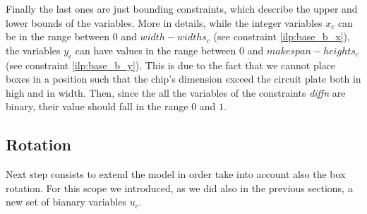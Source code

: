     Finally the last ones are just bounding constraints, which describe the upper and lower bounds
    of the variables. More in details, while the integer variables $x_c$ can be in the range 
    between $0$ and $width-widths_c$ (see constraint \ref{ilp:base_b_x}), the variables $y_c$ can have
    values in the range between $0$ and $makespan-heights_c$ (see constraint \ref{ilp:base_b_y}). 
    This is due to the fact that we cannot place boxes in a position such that the chip's dimension 
    exceed the circuit plate both in high and in width. Then, since the all the variables of the 
    constraints \textit{diffn} are binary, their value should fall in the range $0$ and $1$.

\subsection{Rotation}
    Next step consists to extend the model in order take into account also the box rotation.
    For this scope we introduced, as we did also in the previous sections, a new set of bianary 
    variables $u_c$. 

